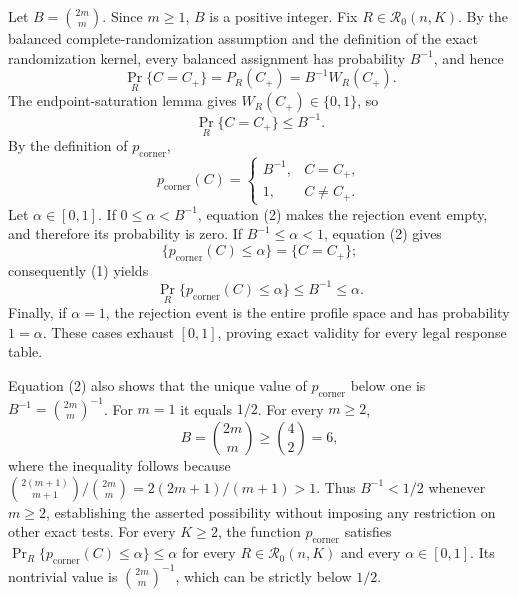 Let \(B=\binom{2m}{m}\).  Since \(m\geq 1\), \(B\) is a positive integer.  Fix \(R\in\mathcal R_0(n,K)\).  By the balanced complete-randomization assumption and the definition of the exact randomization kernel, every balanced assignment has probability \(B^{-1}\), and hence
\[
 \Pr_R\{C=C_+\}=P_R(C_+)=B^{-1}W_R(C_+).
\]
The endpoint-saturation lemma gives \(W_R(C_+)\in\{0,1\}\), so
\[
 \Pr_R\{C=C_+\}\leq B^{-1}. \tag{1}
\]
By the definition of \(p_{\mathrm{corner}}\),
\[
 p_{\mathrm{corner}}(C)=
 \begin{cases}
 B^{-1},&C=C_+,\\
 1,&C\neq C_+.
 \end{cases} \tag{2}
\]
Let \(\alpha\in[0,1]\).  If \(0\leq\alpha<B^{-1}\), equation (2) makes the rejection event empty, and therefore its probability is zero.  If \(B^{-1}\leq\alpha<1\), equation (2) gives
\[
 \{p_{\mathrm{corner}}(C)\leq\alpha\}=\{C=C_+\};
\]
consequently (1) yields
\[
 \Pr_R\{p_{\mathrm{corner}}(C)\leq\alpha\}
 \leq B^{-1}\leq\alpha.
\]
Finally, if \(\alpha=1\), the rejection event is the entire profile space and has probability \(1=\alpha\).  These cases exhaust \([0,1]\), proving exact validity for every legal response table.

Equation (2) also shows that the unique value of \(p_{\mathrm{corner}}\) below one is \(B^{-1}=\binom{2m}{m}^{-1}\).  For \(m=1\) it equals \(1/2\).  For every \(m\geq2\),
\[
 B=\binom{2m}{m}\geq\binom{4}{2}=6,
\]
where the inequality follows because \(\binom{2(m+1)}{m+1}/\binom{2m}{m}=2(2m+1)/(m+1)>1\).  Thus \(B^{-1}<1/2\) whenever \(m\geq2\), establishing the asserted possibility without imposing any restriction on other exact tests.
For every \(K\geq2\), the function \(p_{\mathrm{corner}}\) satisfies \(\Pr_R\{p_{\mathrm{corner}}(C)\leq\alpha\}\leq\alpha\) for every \(R\in\mathcal R_0(n,K)\) and every \(\alpha\in[0,1]\). Its nontrivial value is \(\binom{2m}{m}^{-1}\), which can be strictly below \(1/2\).
